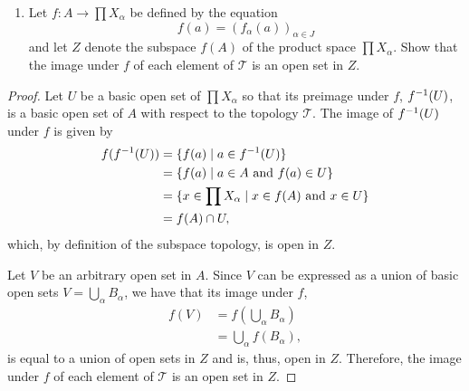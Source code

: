 \begin{solution}
    \begin{enumerate}[label={(\alph*)}, align=left, leftmargin=\parindent, listparindent=\parindent, labelwidth=0pt, itemindent=!]
        \addtocounter{enumi}{3} 
        \item Let $f: A \rightarrow \prod X_\alpha$ be defined by the equation
        \begin{equation*}
            f(a) = (f_\alpha(a))_{\alpha \in J}
        \end{equation*}
        and let $Z$ denote the subspace $f(A)$ of the product space $\prod X_\alpha$.
        Show that the image under $f$ of each element of $\mathcal{T}$ is an open set in $Z$.
    \end{enumerate}
    \begin{proof}
        Let $U$ be a basic open set of $\prod X_\alpha$ so that its preimage under $f$, $f^{-1}(U)$, is a basic open set of $A$ with respect to the topology $\mathcal{T}$.
        The image of $f^{-1}(U)$ under $f$ is given by
        \begin{align*}
            f(f^{-1}(U)) &= \{f(a) \mid a \in f^{-1}(U)\} \\
                        &= \{f(a) \mid a \in A \text{ and } f(a) \in U\} \\
                        &= \{x \in \prod X_\alpha \mid x \in f(A) \text{ and } x \in U\} \\
                        &= f(A) \cap U,
        \end{align*}
        which, by definition of the subspace topology, is open in $Z$.

        Let $V$ be an arbitrary open set in $A$.
        Since $V$ can be expressed as a union of basic open sets $V = \bigcup_\alpha B_\alpha$, we have that its image under $f$,
        \begin{align*}
            f(V)    &= f(\bigcup_\alpha B_\alpha) \\
                    &= \bigcup_\alpha f(B_\alpha),
        \end{align*}
        is equal to a union of open sets in $Z$ and is, thus, open in $Z$.
        Therefore, the image under $f$ of each element of $\mathcal{T}$ is an open set in $Z$.
    \end{proof}
\end{solution}
\newpage
